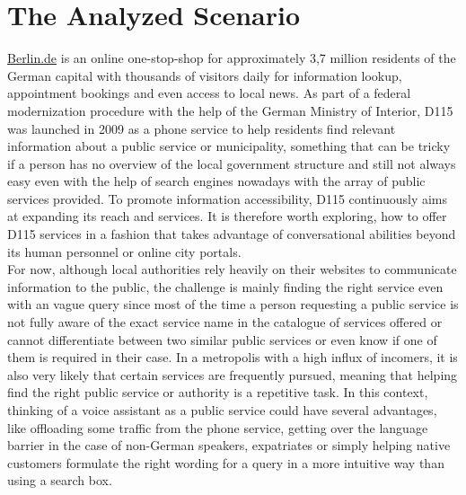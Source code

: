 \section{The Analyzed Scenario}
\href{https://www.berlin.de}{Berlin.de} is an online one-stop-shop for approximately 3,7 million residents of the German capital\cite{zensus} with thousands of visitors daily for information lookup, appointment bookings and even access to local news.
As part of a federal modernization procedure with the help of the German Ministry of Interior, D115 was launched in 2009 \cite{d115} as a phone service to help residents find relevant information about a public service or municipality, something that can be tricky if a person has no overview of the local government structure and still not always easy even with the help of search engines nowadays with the array of public services provided.
To promote information accessibility, D115 continuously aims at expanding its reach and services.
It is therefore worth exploring, how to offer D115 services in a fashion that takes advantage of conversational abilities beyond its human personnel or online city portals. 
\\

For now, although local authorities rely heavily on their websites to communicate information to the public, the challenge is mainly finding the right service even with an vague query since most of the time a person requesting a public service is not fully aware of the exact service name in the catalogue of services offered or cannot differentiate between two similar public services or even know if one of them is required in their case.
In a metropolis with a high influx of incomers, it is also very likely that certain services are frequently pursued, meaning that helping find the right public service or authority is a repetitive task. In this context, thinking of a voice assistant as a public service could have several advantages, like offloading some traffic from the phone service, getting over the language barrier in the case of non-German speakers, expatriates or simply helping native customers formulate the right wording for a query in a more intuitive way than using a search box. 

